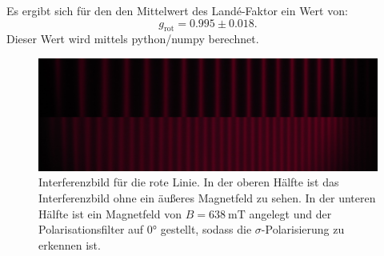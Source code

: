 Es ergibt sich für den den Mittelwert des Landé-Faktor ein Wert von:
\begin{equation}
  \label{eq:lande_rot}
  g_\text{rot} = 0.995\pm0.018.
\end{equation}
Dieser Wert wird mittels python/numpy \cite{numpy} berechnet.
\begin{figure}
  \centering
  \includegraphics[width=\textwidth]{rotcut.jpg}
  \caption{Interferenzbild für die rote Linie. In der oberen Hälfte ist das Interferenzbild
  ohne ein äußeres Magnetfeld zu sehen. In der unteren Hälfte ist ein Magnetfeld von
  $B=\SI{638}{\milli\tesla}$ angelegt und der Polarisationsfilter auf $0°$ gestellt, sodass
  die $\sigma$-Polarisierung zu erkennen ist.}
  \label{fig:rotcut}
\end{figure}

